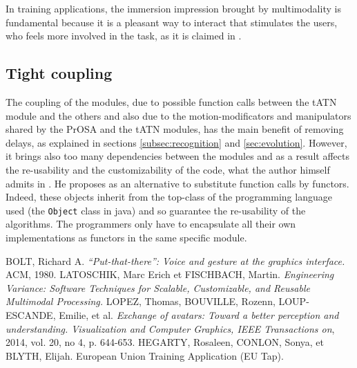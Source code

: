 \documentclass[a4paper]{article}
\begin{document}
In training applications, the immersion impression brought by multimodality is fundamental because it is a pleasant way to interact that stimulates the users, who feels more involved in the task, as it is claimed in \cite{eutap}. 

\subsection{Tight coupling}
The coupling of the modules, due to possible function calls between the tATN module and the others and also due to the motion-modificators and manipulators shared by the PrOSA and the tATN modules, has the main benefit of removing delays, as explained in sections \ref{subsec:recognition} and \ref{sec:evolution}. However, it brings also too many dependencies between the modules and as a result affects the re-usability and the customizability of the code, what the author himself admits in \cite{hcii}. He proposes as an alternative to substitute function calls by functors. Indeed, these objects inherit from the top-class of the programming language used (the \texttt{Object} class in java) and so guarantee the re-usability of the algorithms. The programmers only have to encapsulate all their own implementations as functors in the same specific module. 

\begin{thebibliography}{1}
	 BOLT, Richard A. \textit{“Put-that-there”: Voice and gesture at the graphics interface.} ACM, 1980.
	 LATOSCHIK, Marc Erich et FISCHBACH, Martin. \textit{Engineering Variance: Software Techniques for Scalable, Customizable, and Reusable Multimodal Processing.}
	 LOPEZ, Thomas, BOUVILLE, Rozenn, LOUP-ESCANDE, Emilie, et al. \textit{Exchange of avatars: Toward a better perception and understanding. Visualization and Computer Graphics, IEEE Transactions on}, 2014, vol. 20, no 4, p. 644-653.
	 HEGARTY, Rosaleen, CONLON, Sonya, et BLYTH, Elijah. European Union Training Application (EU Tap).
\end{thebibliography}
\end{document}
